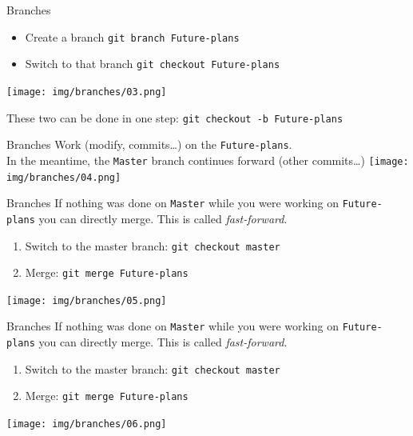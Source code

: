 \documentclass[usenames,dvipsnames,9pt]{beamer}
\begin{document}
%
\begin{frame}{Branches}
  \begin{itemize}
    \item Create a branch \lstinline|git branch Future-plans|
    \item Switch to that branch \lstinline|git checkout Future-plans|
  \end{itemize}
  \vspace{-1cm}
  \texttt{[image: img/branches/03.png]}
  \vspace{-1cm}

  These two can be done in one step: \lstinline|git checkout -b Future-plans|
\end{frame}

%
\begin{frame}{Branches}
  Work (modify, commits\ldots) on the \texttt{Future-plans}.\\
  In the meantime, the \texttt{Master} branch continues forward (other commits\ldots)
  \texttt{[image: img/branches/04.png]}
\end{frame}

%
\begin{frame}{Branches}
  If nothing was done on \texttt{Master} while you were working on \texttt{Future-plans} you can directly merge. This is called \emph{fast-forward}.
  \begin{enumerate}
    \item Switch to the master branch: \lstinline|git checkout master|
    \item Merge: \lstinline|git merge Future-plans|
  \end{enumerate}
  \vspace{-1cm}
  \texttt{[image: img/branches/05.png]}
\end{frame}

%
\begin{frame}{Branches}
  \vspace{0.2cm}
  If nothing was done on \texttt{Master} while you were working on \texttt{Future-plans} you can directly merge. This is called \emph{fast-forward}.
  \begin{enumerate}
    \item Switch to the master branch: \lstinline|git checkout master|
    \item Merge: \lstinline|git merge Future-plans|
  \end{enumerate}
  \vspace{-0.8cm}
  \hspace{0.07cm}\texttt{[image: img/branches/06.png]}
\end{frame}
\end{document}
